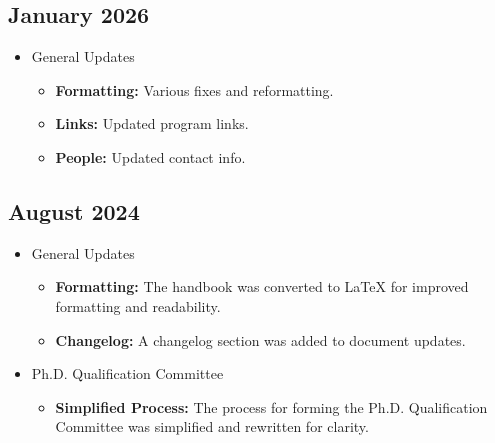\subsection*{January 2026}


\begin{itemize}[nosep]
  \item General Updates
\begin{itemize}[nosep]
  \item \textbf{Formatting:} Various fixes and reformatting.
  \item \textbf{Links:} Updated program links.
  \item \textbf{People:} Updated contact info.
\end{itemize}
\end{itemize}


\subsection*{August 2024}


\begin{itemize}[nosep]
  \item General Updates
\begin{itemize}[nosep]
  \item \textbf{Formatting:} The handbook was converted to \LaTeX{} for improved formatting and readability.
  \item \textbf{Changelog:} A changelog section was added to document updates.
\end{itemize}
\end{itemize}

\begin{itemize}[nosep]
  \item Ph.D. Qualification Committee
\begin{itemize}[nosep]
  \item \textbf{Simplified Process:} The process for forming the Ph.D. Qualification Committee was simplified and rewritten for clarity.
\end{itemize}
\end{itemize}

